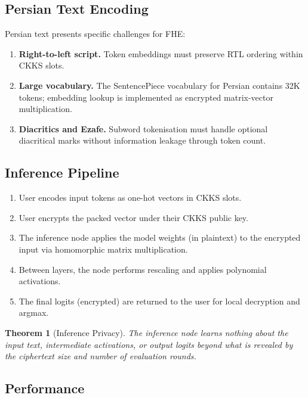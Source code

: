 \documentclass[11pt,a4paper]{article}
\newtheorem{theorem}{Theorem}[section]
\begin{document}
\subsection{Persian Text Encoding}

Persian text presents specific challenges for FHE:

\begin{enumerate}
    \item \textbf{Right-to-left script.}  Token embeddings must preserve
    RTL ordering within CKKS slots.
    \item \textbf{Large vocabulary.}  The SentencePiece vocabulary for
    Persian contains 32K tokens; embedding lookup is implemented as
    encrypted matrix-vector multiplication.
    \item \textbf{Diacritics and Ezafe.}  Subword tokenisation must
    handle optional diacritical marks without information leakage
    through token count.
\end{enumerate}

\subsection{Inference Pipeline}

\begin{enumerate}
    \item User encodes input tokens as one-hot vectors in CKKS slots.
    \item User encrypts the packed vector under their CKKS public key.
    \item The inference node applies the model weights (in plaintext) to
    the encrypted input via homomorphic matrix multiplication.
    \item Between layers, the node performs rescaling and applies
    polynomial activations.
    \item The final logits (encrypted) are returned to the user for
    local decryption and argmax.
\end{enumerate}

\begin{theorem}[Inference Privacy]
    The inference node learns nothing about the input text, intermediate
    activations, or output logits beyond what is revealed by the
    ciphertext size and number of evaluation rounds.
\end{theorem}

\subsection{Performance}
\end{document}
